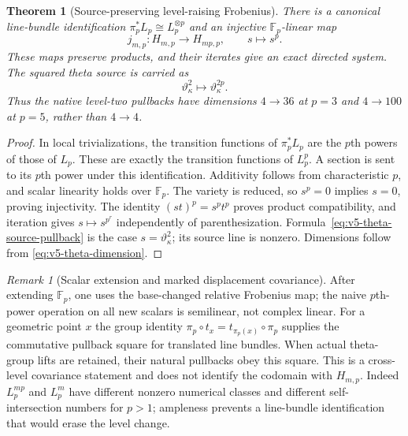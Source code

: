 \documentclass[11pt]{article}
\newtheorem{theorem}{Theorem}[section]
\theoremstyle{definition}
\theoremstyle{remark}
\newtheorem{remark}[remark]{Remark}
\newcommand{\F}{\mathbb F}
\begin{document}
\begin{theorem}[Source-preserving level-raising Frobenius]
\label{thm:v5-level-raising}
There is a canonical line-bundle identification
$\pi_p^*L_p\cong L_p^{\otimes p}$ and an injective $\F_p$-linear map
\begin{equation}
 \boxed{j_{m,p}:H_{m,p}\longrightarrow H_{mp,p},\qquad s\longmapsto s^p.}
 \label{eq:v5-level-map}
\end{equation}
These maps preserve products, and their iterates give an exact directed
system. The squared theta source is carried as
\begin{equation}
 \boxed{\vartheta_\kappa^2\longmapsto\vartheta_\kappa^{2p}.}
 \label{eq:v5-theta-source-pullback}
\end{equation}
Thus the native level-two pullbacks have dimensions $4\to36$ at $p=3$ and
$4\to100$ at $p=5$, rather than $4\to4$.
\end{theorem}
\begin{proof}
In local trivializations, the transition functions of $\pi_p^*L_p$ are
the $p$th powers of those of $L_p$. These are exactly the transition
functions of $L_p^p$. A section is sent to its $p$th power under this
identification. Additivity follows from characteristic $p$, and scalar
linearity holds over $\F_p$. The variety is reduced, so $s^p=0$ implies
$s=0$, proving injectivity. The identity $(st)^p=s^pt^p$ proves product
compatibility, and iteration gives $s\mapsto s^{p^r}$ independently of
parenthesization. Formula~\eqref{eq:v5-theta-source-pullback} is the case
$s=\vartheta_\kappa^2$; its source line is nonzero. Dimensions follow from
\eqref{eq:v5-theta-dimension}.
\end{proof}

\begin{remark}[Scalar extension and marked displacement covariance]
After extending $\F_p$, one uses the base-changed relative Frobenius map;
the naive $p$th-power operation on all new scalars is semilinear, not
complex linear. For a geometric point $x$ the group identity
$\pi_p\circ t_x=t_{\pi_p(x)}\circ\pi_p$ supplies the commutative
pullback square for translated line bundles. When actual theta-group
lifts are retained, their natural pullbacks obey this square. This is a
cross-level covariance statement and does not identify the codomain with
$H_{m,p}$. Indeed $L_p^{mp}$ and $L_p^m$ have different nonzero numerical
classes and different self-intersection numbers for $p>1$; ampleness
prevents a line-bundle identification that would erase the level change.
\end{remark}
\end{document}
